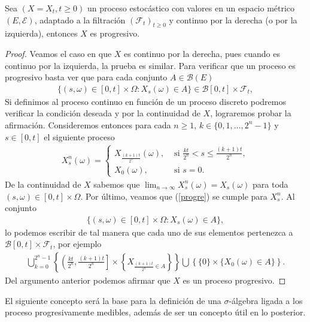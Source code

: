 \begin{proposition}
	Sea $(X = X_t, t \geq 0)$ un proceso estocástico con valores en un espacio métrico $(E, \mathcal{E})$, adaptado a la filtración $(\mathcal{F}_t)_{t \geq 0}$ y continuo por la derecha (o por la izquierda), entonces $X$ es progresivo.
\end{proposition}
\begin{proof}
	Veamos el caso en que $X$ es continuo por la derecha, pues cuando es continuo por la izquierda, la prueba es similar. Para verificar que un proceso es progresivo basta ver que para cada conjunto $A \in \mathcal{B}(E)$
	\begin{align}
	\{ (s, \omega) \in [0, t] \times \Omega : X_s(\omega) \in A \} \in \mathcal{B}[0, t] \times \mathcal{F}_t, \label{progre}
	\end{align}
	Si definimos al proceso continuo en función de un proceso discreto podremos verificar la condición deseada y por la continuidad de $X$, lograremos probar la afirmación. Consideremos entonces para cada $n \geq 1$, $k \in \{ 0, 1, \ldots, 2^n - 1 \}$ y $s \in [0, t]$ el siguiente proceso
	\begin{align*}
	X_s^n (\omega) = 
	\begin{cases}
	X_{\frac{(k+1)t}{2^n}} (\omega), & \text{ si } \frac{kt}{2^n} < s \leq \frac{(k+1)t}{2^n}, \\
	X_0 (\omega), & \text{ si } s = 0.
	\end{cases}
	\end{align*}
	De la continuidad de $X$ sabemos que $\lim_{n \rightarrow \infty} X_s^n (\omega) = X_s (\omega)$ para toda $(s, \omega) \in [0, t] \times \Omega$. Por último, veamos que (\ref{progre}) se cumple para $X_s^n$. Al conjunto
	\begin{align*}
	\{ (s, \omega) \in [0, t] \times \Omega : X_s(\omega) \in A \},
	\end{align*}
	lo podemos escribir de tal manera que cada uno de sus elementos pertenezca a $\mathcal{B}[0, t] \times \mathcal{F}_t$, por ejemplo
	\begin{align*}
	\bigcup_{k = 0}^{2^n - 1} \left\{ \left( \frac{kt}{2^n}, \frac{(k+1)t}{2^n} \right] \times \left\{ X_{\frac{(k+1)t}{2^n} \in A} \right\}  \right\} \bigcup\left\{ \{0\} \times \{X_0(\omega) \in A\} \right\}.
	\end{align*}
	Del argumento anterior podemos afirmar que $X$ es un proceso progresivo.
\end{proof}

El siguiente concepto será la base para la definición de una $\sigma$-álgebra ligada a los proceso progresivamente medibles, además de ser un concepto útil en lo posterior.

